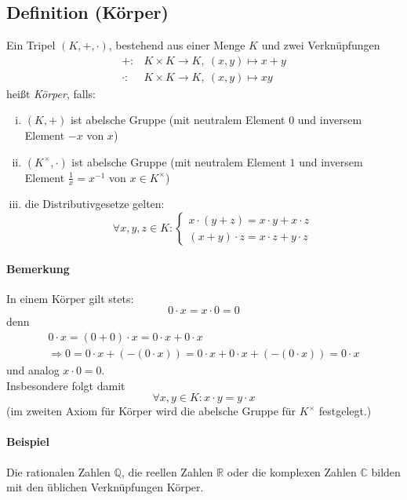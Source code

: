 \subsection{Definition (Körper)}
	\begin{Definition}[Körper]
		Ein Tripel $(K,+,\cdot)$, bestehend aus einer Menge $K$ und zwei Verknüpfungen
                \begin{align*}
                        +:&K\times K\to K,\ (x,y)\mapsto x+y\\
                        \cdot : &K\times K\to K,\ (x,y)\mapsto xy
                \end{align*}
                heißt \emph{Körper}, falls:
                \begin{enumerate}[(i)]
                        \item $(K,+)$ ist abelsche Gruppe (mit neutralem Element $0$ und inversem Element $-x$ von $x$)
                        \item $(K^\times,\cdot)$ ist abelsche Gruppe (mit neutralem Element $1$ und inversem Element $\frac{1}{x} = x^{-1}$ von $x\in K^\times$)
                        \item die Distributivgesetze gelten:
                                \[ \forall x,y,z\in K :\begin{cases}x\cdot (y+z) = x\cdot y+x\cdot z\\ (x+y)\cdot z = x\cdot z+y\cdot z \end{cases} \]
                \end{enumerate}
	\end{Definition}

\paragraph{Bemerkung}
	In einem Körper gilt stets:
		\[0\cdot x = x\cdot 0 = 0\]
        denn
		\begin{gather*}
		0\cdot x = (0+0)\cdot x = 0\cdot x + 0\cdot x \\
		\Rightarrow 0 = 0\cdot x + (-(0\cdot x)) = 0\cdot x + 0\cdot x + (-(0\cdot x)) = 0\cdot x
		\end{gather*}
	und analog $x\cdot 0 = 0$.\\
	Insbesondere folgt damit 
	\[\forall x,y\in K: x\cdot y = y\cdot x\]
	(im zweiten Axiom für Körper wird die abelsche Gruppe für $K^\times$ festgelegt.)
	
\paragraph{Beispiel}
	Die rationalen Zahlen $\mathbb{Q}$, die reellen Zahlen $\mathbb{R}$ oder die komplexen Zahlen $\mathbb{C}$ bilden mit den üblichen Verknüpfungen Körper.

